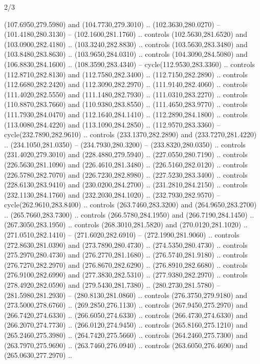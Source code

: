 \begin{flagdescription}{2/3}
\begin{scope}[xshift=0.5\flaglength,yshift=0.5\flagwidth,scale=\stretchfactor]
\begin{scope}[scale=0.001645\flagwidth,yshift=65mm,xshift=-63mm]
\begin{scope}[y=0.80pt, x=0.80pt, yscale=-1,]
\begin{scope}[cm={{1.33333,0.0,0.0,1.33333,(0.0,1e-05)}}]
  (107.6950,279.5980) and (104.7730,279.3010) .. (102.3630,280.0270) --
  (101.4180,280.3130) -- (102.1600,281.1760) .. controls (102.5630,281.6520) and
  (103.0900,282.4180) .. (103.3240,282.8830) .. controls (103.5630,283.3480) and
  (103.8480,283.8630) .. (103.9650,284.0310) .. controls (104.3090,284.5080) and
  (106.8830,284.1600) .. (108.3590,283.4340) -- cycle(112.9530,283.3360) ..
  controls (112.8710,282.8130) and (112.7580,282.3400) .. (112.7150,282.2890) ..
  controls (112.6680,282.2420) and (112.3090,282.2970) .. (111.9140,282.4060) ..
  controls (111.4020,282.5550) and (111.1480,282.7930) .. (111.0310,283.2270) ..
  controls (110.8870,283.7660) and (110.9380,283.8550) .. (111.4650,283.9770) ..
  controls (111.7930,284.0470) and (112.1640,284.1410) .. (112.2890,284.1800) ..
  controls (113.0080,284.4220) and (113.1090,284.2850) .. (112.9570,283.3360) --
  cycle(232.7890,282.9610) .. controls (233.1370,282.2890) and
  (233.7270,281.4220) .. (234.1050,281.0350) -- (234.7930,280.3200) --
  (233.8320,280.0350) .. controls (231.4020,279.3010) and (228.4880,279.5940) ..
  (227.0550,280.7190) .. controls (226.5630,281.1090) and (226.4610,281.3480) ..
  (226.5160,282.0120) .. controls (226.5780,282.7070) and (226.7230,282.8980) ..
  (227.5230,283.3400) .. controls (228.6130,283.9410) and (230.0200,284.2700) ..
  (231.2810,284.2150) .. controls (232.1130,284.1760) and (232.2030,284.1020) ..
  (232.7930,282.9570) -- cycle(262.9610,283.8400) .. controls
  (263.7460,283.3200) and (264.9650,283.2700) .. (265.7660,283.7300) .. controls
  (266.5780,284.1950) and (266.7190,284.1450) .. (267.3050,283.1950) .. controls
  (268.3010,281.5820) and (270.0120,281.1020) .. (271.0510,282.1410) --
  (271.6020,282.6910) -- (272.1990,281.9060) .. controls (272.8630,281.0390) and
  (273.7890,280.4730) .. (274.5350,280.4730) .. controls (275.2970,280.4730) and
  (276.2770,281.1680) .. (276.5740,281.9180) .. controls (276.7270,282.2970) and
  (276.8670,282.6290) .. (276.8910,282.6680) .. controls (276.9100,282.6990) and
  (277.3830,282.5310) .. (277.9380,282.2970) .. controls (278.4920,282.0590) and
  (279.5430,281.7380) .. (280.2730,281.5780) -- (281.5980,281.2930) --
  (280.8130,281.0860) .. controls (276.3750,279.9180) and (273.5000,278.6760) ..
  (269.2850,276.1130) .. controls (267.9450,275.2970) and (266.7420,274.6330) ..
  (266.6050,274.6330) .. controls (266.4730,274.6330) and (266.2070,274.7730) ..
  (266.0120,274.9450) .. controls (265.8160,275.1210) and (265.2460,275.3980) ..
  (264.7420,275.5660) .. controls (264.2460,275.7300) and (263.7970,275.9690) ..
  (263.7460,276.0940) .. controls (263.6050,276.4690) and (265.0630,277.2970) ..

\end{scope}
\end{scope}
\end{scope}
\end{scope}
\end{flagdescription}

